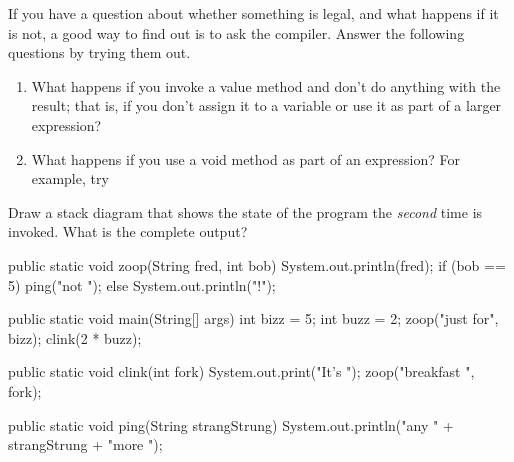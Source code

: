 \begin{exercise}  %

If you have a question about whether something is legal, and what happens if it is not, a good way to find out is to ask the compiler.
Answer the following questions by trying them out.

\begin{enumerate}

\item What happens if you invoke a value method and don't do anything with the result; that is, if you don't assign it to a variable or use it as part of a larger expression?

\item What happens if you use a void method as part of an expression?
For example, try 

\end{enumerate}

\end{exercise}


\begin{exercise}  %

Draw a stack diagram that shows the state of the program the {\it second} time  is invoked.
What is the complete output?

\begin{code}
public static void zoop(String fred, int bob) {
    System.out.println(fred);
    if (bob == 5) {
        ping("not ");
    } else {
        System.out.println("!");
    }
}
\end{code}

\begin{code}
public static void main(String[] args) {
    int bizz = 5;
    int buzz = 2;
    zoop("just for", bizz);
    clink(2 * buzz);
}
\end{code}

\begin{code}
public static void clink(int fork) {
    System.out.print("It's ");
    zoop("breakfast ", fork);
}
\end{code}

\begin{code}
public static void ping(String strangStrung) {
    System.out.println("any " + strangStrung + "more ");
}
\end{code}

\end{exercise}


